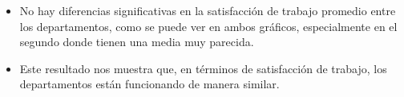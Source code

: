 \begin{itemize}
    \item No hay diferencias significativas en la satisfacción de trabajo promedio entre los departamentos, 
    como se puede ver en ambos gráficos, especialmente en el segundo donde tienen una media muy parecida.
    \item Este resultado nos muestra que, en términos de satisfacción de trabajo, los departamentos están funcionando de manera similar.
\end{itemize}